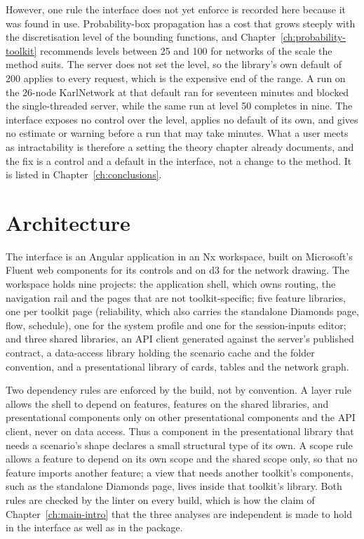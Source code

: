 \documentclass[12pt]{report}
\begin{document}
However, one rule the interface does not yet enforce is recorded here because it was found
in use.
Probability-box propagation has a cost that grows steeply with the discretisation level of
the bounding functions, and Chapter~\ref{ch:probability-toolkit} recommends levels between
25 and 100 for networks of the scale the method suits. The server does not set the level,
so the library's own default of 200 applies to every request, which is the expensive end of
the range. A run on the 26-node KarlNetwork at that default ran for seventeen minutes and
blocked the single-threaded server, while the same run at level 50 completes in nine.
The interface exposes no control over the level, applies no default of its own, and gives
no estimate or warning before a run that may take minutes. What a user meets as
intractability is therefore a setting the theory chapter already documents, and the fix
is a control and a default in the interface, not a change to the method. It is listed in
Chapter~\ref{ch:conclusions}.

\section{Architecture}
\label{sec:fe-architecture}

The interface is an Angular application in an Nx workspace, built on Microsoft's Fluent
web components for its controls and on d3 for the network drawing. The workspace holds
nine projects: the application shell, which owns routing, the navigation rail and the
pages that are not toolkit-specific; five feature libraries, one per toolkit page
(reliability, which also carries the standalone Diamonds page, flow, schedule), one for
the system profile and one for the session-inputs editor; and three shared libraries, an
API client generated against the server's published contract, a data-access library
holding the scenario cache and the folder convention, and a presentational library of
cards, tables and the network graph.

Two dependency rules are enforced by the build, not by convention. A layer rule allows the
shell to depend on features, features on the shared libraries, and presentational
components only on other presentational components and the API client, never on data
access. Thus a component in the presentational library that needs a scenario's shape
declares a small structural type of its own. A scope rule allows a feature to depend on its
own scope and the shared scope only, so that no feature imports another feature; a view
that needs another toolkit's components, such as the standalone Diamonds page, lives inside
that toolkit's library. Both rules are checked by the linter on every build, which is how
the claim of Chapter~\ref{ch:main-intro} that the three analyses are independent is made
to hold in the interface as well as in the package.
\end{document}
